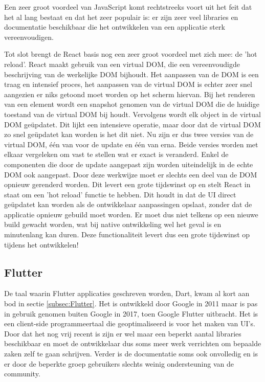 Een zeer groot voordeel van JavaScript komt rechtstreeks voort uit het feit dat het al lang bestaat en dat het zeer populair is: er zijn zeer veel libraries en documentatie beschikbaar die het ontwikkelen van een applicatie sterk vereenvoudigen.

Tot slot brengt de React basis nog een zeer groot voordeel met zich mee: de 'hot reload'. React maakt gebruik van een virtual DOM, die een vereenvoudigde beschrijving van de werkelijke DOM bijhoudt. Het aanpassen van de DOM is een traag en intensief proces, het aanpassen van de virtual DOM is echter zeer snel aangezien er niks getoond moet worden op het scherm hiervan. Bij het renderen van een element wordt een snapshot genomen van de virtual DOM die de huidige toestand van de virtual DOM bij houdt. Vervolgens wordt elk object in de virtual DOM geüpdatet. Dit lijkt een intensieve operatie, maar door dat de virtual DOM zo snel geüpdatet kan worden is het dit niet. Nu zijn er dus twee versies van de virtual DOM, één van voor de update en één van erna. Beide versies worden met elkaar vergeleken om vast te stellen wat er exact is veranderd. Enkel de componenten die door de update aangepast zijn worden uiteindelijk in de echte DOM ook aangepast. Door deze werkwijze moet er slechts een deel van de DOM opnieuw gerenderd worden. Dit levert een grote tijdswinst op en stelt React in staat om een 'hot reload' functie te hebben. Dit houdt in dat de UI direct geüpdatet kan worden als de ontwikkelaar aanpassingen opslaat, zonder dat de applicatie opnieuw gebuild moet worden. Er moet dus niet telkens op een nieuwe build gewacht worden, wat bij native ontwikkeling wel het geval is en minutenlang kan duren. Deze functionaliteit levert dus een grote tijdswinst op tijdens het ontwikkelen!

\subsection{Flutter}
\label{subsubsec:taalFlutter}

De taal waarin Flutter applicaties geschreven worden, Dart, kwam al kort aan bod in sectie \ref{subsec:Flutter}. Het is ontwikkeld door Google in 2011 maar is pas in gebruik genomen buiten Google in 2017, toen Google Flutter uitbracht. Het is een client-side programmeertaal die geoptimaliseerd is voor het maken van UI's. Door dat het nog vrij recent is zijn er wel maar een beperkt aantal libraries beschikbaar en moet de ontwikkelaar dus soms meer werk verrichten om bepaalde zaken zelf te gaan schrijven. Verder is de documentatie soms ook onvolledig en is er door de beperkte groep gebruikers slechts weinig ondersteuning van de community.

